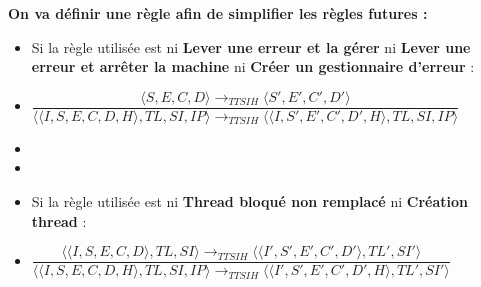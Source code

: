 \documentclass[10pt,a4paper]{report}
\begin{document}
	
	\textbf{On va définir une règle afin de simplifier les règles futures :} 
	\begin{itemize}
		\item[] Si la règle utilisée est ni \textbf{Lever une erreur et la gérer} ni \textbf{Lever une erreur et arrêter la machine} ni \textbf{Créer un gestionnaire d'erreur}  :
		\item[] \begin{center}
			$\dfrac{\langle S,E,C,D\rangle \longrightarrow_{TTSIH} \langle S',E',C',D'\rangle}{\langle\langle I,S,E,C,D,H\rangle,TL,SI,IP\rangle \longrightarrow_{TTSIH} \langle\langle I,S',E',C',D',H\rangle,TL,SI,IP\rangle}$
		\end{center}
		\item[]
		\item[]
		\item[] Si la règle utilisée est ni \textbf{Thread bloqué non remplacé} ni \textbf{Création thread} :
		\smallbreak 
		\item[] \begin{center}
			$\dfrac{\langle\langle I,S,E,C,D\rangle,TL,SI\rangle \longrightarrow_{TTSIH} \langle\langle I',S',E',C',D'\rangle,TL',SI'\rangle}{\langle\langle I,S,E,C,D,H\rangle,TL,SI,IP\rangle \longrightarrow_{TTSIH} \langle\langle I',S',E',C',D',H\rangle,TL',SI'\rangle}$ 
		\end{center}
	\end{itemize}
	\newpage
	
\end{document}

